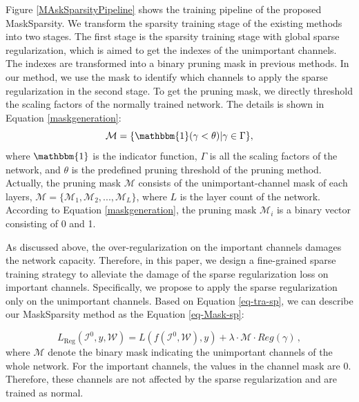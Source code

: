 \documentclass[review]{cvpr}
\begin{document}
Figure \ref{MAskSparsityPipeline} shows the training pipeline of the proposed MaskSparsity. We transform the sparsity training stage of the existing methods into two stages. The first stage is the sparsity training stage with global sparse regularization, which is aimed to get the indexes of the unimportant channels. The indexes are transformed into a binary pruning mask in previous methods. In our method, we use the mask to identify which channels to apply the sparse regularization in the second stage. To get the pruning mask, we directly threshold the scaling factors of the normally trained network. The details is shown in Equation \ref{maskgeneration}:
\begin{equation}
	\mathcal{M} = \{\mathbbm{1}(\gamma<\theta)|\gamma \in \Gamma\},
	\label{maskgeneration}
\end{equation}
where $\mathbbm{1}$ is the indicator function, $\Gamma$ is all the scaling factors of the network, and $\theta$ is the predefined pruning threshold of the pruning method. Actually, the pruning mask $\mathcal{M}$ consists of the unimportant-channel mask of each layers, \ie $\mathcal{M} = \{ \mathcal{M}_1, \mathcal{M}_2, ..., \mathcal{M}_L \} $, where $L$ is the layer count of the network. According to Equation \ref{maskgeneration}, the pruning mask $\mathcal{M}_i$ is a binary vector consisting of 0 and 1.

As discussed above, the over-regularization on the important channels damages the network capacity. Therefore, in this paper, we design a fine-grained sparse training strategy to alleviate the damage of the sparse regularization loss on important channels.
Specifically, we propose to apply the sparse regularization only on the unimportant channels. Based on Equation \ref{eq-tra-sp}, we can describe our MaskSparsity method as the Equation \ref{eq-Mask-sp}:

\begin{equation}\label{eq-Mask-sp}
	L_{\text{Reg}}(\mathcal{I}^0, y, \mathcal{W}) = L(f(\mathcal{I}^0, \mathcal{W}), y) + \lambda \cdot  \mathcal{M} \cdot   Reg({\gamma}) \,,
\end{equation}
where $\mathcal{M}$ denote the binary mask indicating the unimportant channels of the whole network.  For the important channels, the values in the channel mask are 0. Therefore, these channels are not affected by the sparse regularization and are trained as normal. 
\end{document}
